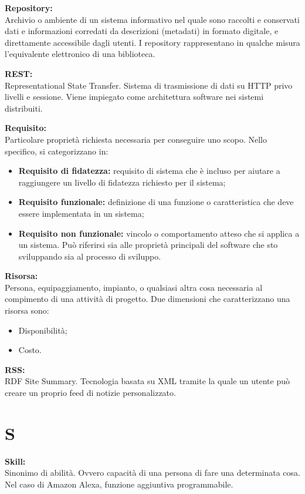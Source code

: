 \documentclass[a4paper, oneside, openany, dvipsnames, table]{article}
\begin{document}
\textbf{Repository:}\\	Archivio o ambiente di un sistema informativo nel quale sono raccolti e conservati dati e informazioni corredati da descrizioni (metadati) in formato digitale, e direttamente accessibile dagli utenti. I repository rappresentano in qualche misura l’equivalente elettronico di una biblioteca.

\textbf{REST:}\\
Representational State Transfer. Sistema di trasmissione di dati su HTTP privo livelli e sessione. Viene impiegato come architettura software nei sistemi distribuiti.

\textbf{Requisito:}\\	Particolare proprietà richiesta necessaria per conseguire uno scopo. Nello specifico, si categorizzano in:
\begin{itemize}
	\item \textbf{Requisito di fidatezza:} requisito di sistema che è incluso per aiutare a raggiungere un livello di fidatezza richiesto per il sistema;
	\item \textbf{Requisito funzionale:} definizione di una funzione o caratteristica che deve essere implementata in un sistema;
	\item \textbf{Requisito non funzionale:} vincolo o comportamento atteso che si applica a un sistema. Può riferirsi sia alle proprietà principali del software che sto sviluppando sia al processo di sviluppo.
\end{itemize}

\textbf{Risorsa:}\\	Persona, equipaggiamento, impianto, o qualsiasi altra cosa necessaria al compimento di una attività di progetto. Due dimensioni che caratterizzano una risorsa sono:
\begin{itemize}
\item Disponibilità;
\item Costo.
\end{itemize} 

\textbf{RSS:}\\	RDF Site Summary. Tecnologia basata su XML tramite la quale un utente può creare un proprio feed di notizie personalizzato.
\newpage
\section{S}
\textbf{Skill:}\\	Sinonimo di abilità. Ovvero capacità di una persona di fare una determinata cosa. Nel caso di Amazon Alexa, funzione aggiuntiva programmabile.
\end{document}

